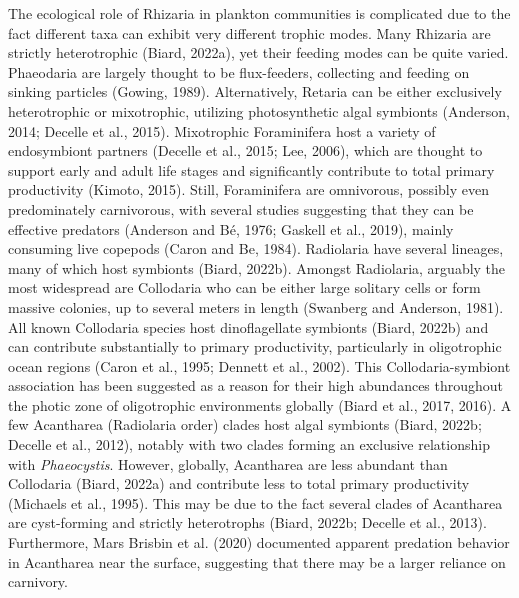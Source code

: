 \documentclass[
]{article}
\begin{document}
The ecological role of Rhizaria in plankton communities is complicated
due to the fact different taxa can exhibit very different trophic modes.
Many Rhizaria are strictly heterotrophic (Biard, 2022a), yet their
feeding modes can be quite varied. Phaeodaria are largely thought to be
flux-feeders, collecting and feeding on sinking particles (Gowing,
1989). Alternatively, Retaria can be either exclusively heterotrophic or
mixotrophic, utilizing photosynthetic algal symbionts (Anderson, 2014;
Decelle et al., 2015). Mixotrophic Foraminifera host a variety of
endosymbiont partners (Decelle et al., 2015; Lee, 2006), which are
thought to support early and adult life stages and significantly
contribute to total primary productivity (Kimoto, 2015). Still,
Foraminifera are omnivorous, possibly even predominately carnivorous,
with several studies suggesting that they can be effective predators
(Anderson and Bé, 1976; Gaskell et al., 2019), mainly consuming live
copepods (Caron and Be, 1984). Radiolaria have several lineages, many of
which host symbionts (Biard, 2022b). Amongst Radiolaria, arguably the
most widespread are Collodaria who can be either large solitary cells or
form massive colonies, up to several meters in length (Swanberg and
Anderson, 1981). All known Collodaria species host dinoflagellate
symbionts (Biard, 2022b) and can contribute substantially to primary
productivity, particularly in oligotrophic ocean regions (Caron et al.,
1995; Dennett et al., 2002). This Collodaria-symbiont association has
been suggested as a reason for their high abundances throughout the
photic zone of oligotrophic environments globally (Biard et al., 2017,
2016). A few Acantharea (Radiolaria order) clades host algal symbionts
(Biard, 2022b; Decelle et al., 2012), notably with two clades forming an
exclusive relationship with \emph{Phaeocystis}. However, globally,
Acantharea are less abundant than Collodaria (Biard, 2022a) and
contribute less to total primary productivity (Michaels et al., 1995).
This may be due to the fact several clades of Acantharea are
cyst-forming and strictly heterotrophs (Biard, 2022b; Decelle et al.,
2013). Furthermore, Mars Brisbin et al. (2020) documented apparent
predation behavior in Acantharea near the surface, suggesting that there
may be a larger reliance on carnivory.
\end{document}
